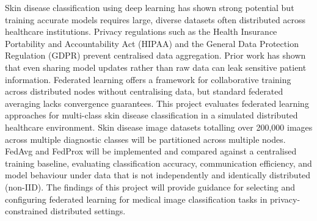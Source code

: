 \documentclass[12pt,openany,a4paper]{book}
\begin{document}

Skin disease classification using deep learning has shown strong potential but training accurate models requires large, diverse datasets often distributed across healthcare institutions. Privacy regulations such as the Health Insurance Portability and Accountability Act (HIPAA) and the General Data Protection Regulation (GDPR) prevent centralised data aggregation. Prior work has shown that even sharing model updates rather than raw data can leak sensitive patient information. Federated learning offers a framework for collaborative training across distributed nodes without centralising data, but standard federated averaging lacks convergence guarantees. This project evaluates federated learning approaches for multi-class skin disease classification in a simulated distributed healthcare environment. Skin disease image datasets totalling over 200,000 images across multiple diagnostic classes will be partitioned across multiple nodes. FedAvg and FedProx will be implemented and compared against a centralised training baseline, evaluating classification accuracy, communication efficiency, and model behaviour under data that is not independently and identically distributed (non-IID). The findings of this project will provide guidance for selecting and configuring federated learning for medical image classification tasks in privacy-constrained distributed settings.

\tableofcontents

\listoffigures
{}

\clearpage
\listoftables
{}

\mainmatter


%
%
%
%	
%	
\end{document}
